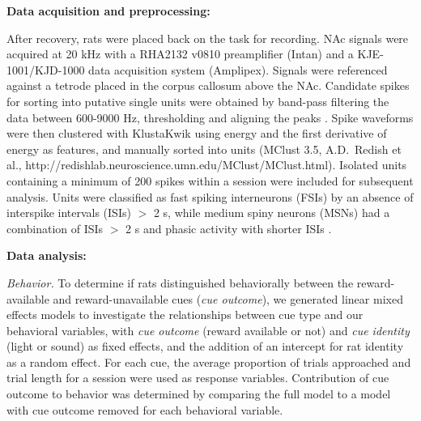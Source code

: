 \documentclass[11pt]{article}
\let\cite=\citep
\begin{document}
{\bf Data acquisition and preprocessing:}

After recovery, rats were placed back on the task for recording. NAc
signals were acquired at 20 kHz with a RHA2132 v0810 preamplifier
(Intan) and a KJE-1001/KJD-1000 data acquisition system
(Amplipex). Signals were referenced against a tetrode placed in the
corpus callosum above the NAc. Candidate spikes for sorting into
putative single units were obtained by band-pass filtering the data
between 600-9000 Hz, thresholding and aligning the peaks \cite[UltraMegaSort2k, ][]{Hill2011}. Spike waveforms were then
clustered with KlustaKwik using energy and the first derivative of
energy as features, and manually sorted into units (MClust 3.5,
A.D.\ Redish et al., http://redishlab.neuroscience.umn.edu/MClust/MClust.html). Isolated units containing a minimum of 200
spikes within a session were included for subsequent analysis. Units
were classified as fast spiking interneurons (FSIs) by an absence of
interspike intervals (ISIs) $>$ 2 s, while medium spiny neurons (MSNs)
had a combination of ISIs $>$ 2 s and phasic activity with shorter
ISIs \cite{Barnes2005,Atallah2014}.

{\bf Data analysis:}

{\it Behavior.} To determine if rats distinguished behaviorally
between the reward-available and reward-unavailable cues ({\it cue
outcome}), we generated linear mixed effects models to investigate
the relationships between cue type and our behavioral variables, with
{\it cue outcome} (reward available or not) and {\it cue identity}
(light or sound) as fixed effects, and the addition of an intercept
for rat identity as a random effect. For each cue, the average
proportion of trials approached and trial length for a session were
used as response variables. Contribution of cue outcome to behavior
was determined by comparing the full model to a model with cue outcome
removed for each behavioral variable.
\end{document}

